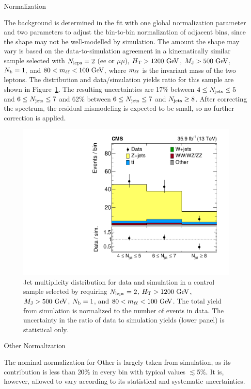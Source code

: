 \begin{section}{\Wjets Normalization}
\label{sec:wjets_normalization}

The \Wjets background is determined in the fit with one global normalization parameter and two parameters to adjust the bin-to-bin normalization of adjacent \Njets bins, since the \Njets shape may not be well-modelled by simulation.
The amount the \Njets shape may vary is based on the data-to-simulation agreement in a kinematically similar \Zjets sample selected with $N_{\mathrm{leps}} = 2$ ($\mathrm{ee}$ or $\mu\mu$), $H_{\mathrm{T}} > 1200~\mathrm{Ge\kern -0.1em V}$, $M_{\mathrm{J}} > 500~\mathrm{Ge\kern -0.1em V}$, $N_{\mathrm{b}} = 1$, and $80 < m_{\ell\ell} < 100~\mathrm{Ge\kern -0.1em V}$, where $m_{\ell\ell}$ is the invariant mass of the two leptons.
The \Njets distribution and data/simulation yields ratio for this sample are shown in Figure~\ref{fig:njets_dy}.
The resulting uncertainties are 17\% between $4 \leq N_{\mathrm{jets}} \leq 5$ and $6 \leq N_{\mathrm{jets}} \leq 7$ and 62\% between $6 \le N_{\mathrm{jets}} \le 7$ and $N_{\mathrm{jets}} \ge8$.
After correcting the \Njets spectrum, the residual \MJ mismodeling is expected to be small, so no further correction is applied.

\begin{figure}[tbp!]
\centering
\includegraphics[angle=0,width=0.60\columnwidth]{fig/njets_dy.pdf}
\caption{Jet multiplicity distribution for data and simulation in a \Zjets control sample selected by requiring $N_{\mathrm{leps}} = 2$, $H_{\mathrm{T}} > 1200~\mathrm{Ge\kern -0.1em V}$, $M_{\mathrm{J}} > 500~\mathrm{Ge\kern -0.1em V}$, $N_{\mathrm{b}} = 1$, and $80 < m_{\ell\ell} < 100~\mathrm{Ge\kern -0.1em V}$.
The total yield from simulation is normalized to the number of events in data.
The uncertainty in the ratio of data to simulation yields (lower panel) is statistical only.}
\label{fig:njets_dy}
\end{figure}

\end{section}

\begin{section}{Other Normalization}

The nominal normalization for Other is largely taken from simulation, as its contribution is less than 20\% in every bin with typical values $\lesssim$5\%.
It is, however, allowed to vary according to its statistical and systematic uncertainties.

\end{section}
